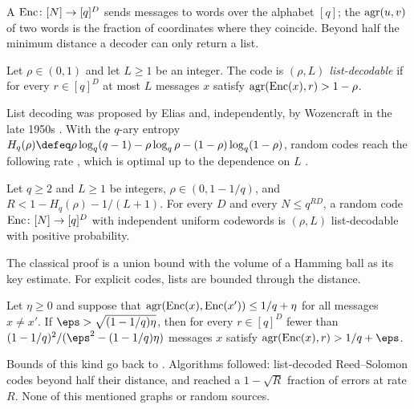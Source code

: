 \begin{refsection}
A  $\operatorname{Enc}\colon[N]\to[q]^D$ sends messages to words over the alphabet $[q]$; the  $\operatorname{agr}(u,v)$ of two words is the fraction of coordinates where they coincide. Beyond half the minimum distance a decoder can only return a list.

\begin{definition}\label{def:pseudorandom:listdec}
Let $\rho\in(0,1)$ and let $L\ge1$ be an integer. The code is \emph{$(\rho,L)$ list-decodable} if for every $r\in[q]^D$ at most $L$ messages $x$ satisfy $\operatorname{agr}(\operatorname{Enc}(x),r)>1-\rho$.
\end{definition}

List decoding was proposed by Elias and, independently, by Wozencraft in the late 1950s \parencite[\S5.6]{Vadhan2012}. With the $q$-ary entropy $H_q(\rho)\defeq\rho\log_q(q-1)-\rho\log_q\rho-(1-\rho)\log_q(1-\rho)$, random codes reach the following rate \parencite{Elias1991}, which is optimal up to the dependence on $L$ \parencite[\S5.1]{Vadhan2012}.

\begin{theorem}\label{thm:pseudorandom:elias}
Let $q\ge2$ and $L\ge1$ be integers, $\rho\in(0,1-1/q)$, and $R<1-H_q(\rho)-1/(L+1)$. For every $D$ and every $N\le q^{RD}$, a random code $\operatorname{Enc}\colon[N]\to[q]^D$ with independent uniform codewords is $(\rho,L)$ list-decodable with positive probability.
\end{theorem}

The classical proof is a union bound with the volume of a Hamming ball as its key estimate. For explicit codes, lists are bounded through the distance.

\begin{theorem}\label{thm:pseudorandom:johnson}
Let $\eta\ge0$ and suppose that $\operatorname{agr}(\operatorname{Enc}(x),\operatorname{Enc}(x'))\le1/q+\eta$ for all messages $x\ne x'$. If $\eps>\sqrt{(1-1/q)\eta}$, then for every $r\in[q]^D$ fewer than $(1-1/q)^2/(\eps^2-(1-1/q)\eta)$ messages $x$ satisfy $\pseudorandomAgr(\pseudorandomEnc(x),r)>1/q+\eps$.
\end{theorem}

Bounds of this kind go back to \textcite{Johnson1962}. Algorithms followed: \textcite{Sudan1997} list-decoded Reed--Solomon codes beyond half their distance, and \textcite{GuruswamiSudan1999} reached a $1-\sqrt R$ fraction of errors at rate $R$. None of this mentioned graphs or random sources.


\end{refsection}
